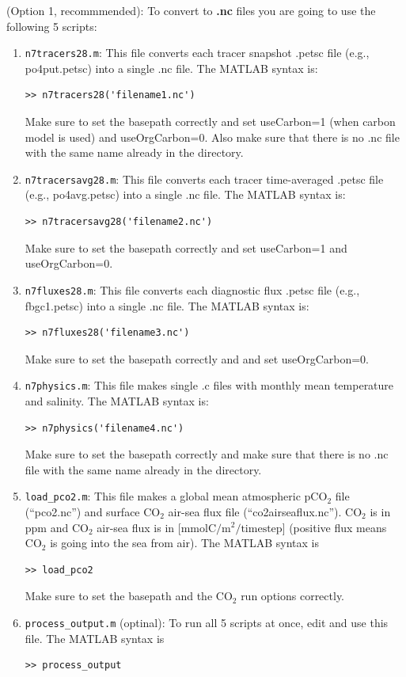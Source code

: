 \documentclass[a4paper]{article}
\def\noin{\noindent }
\begin{document}
\vspace{5mm}
\noin (Option 1, recommmended): To convert to \textbf{.nc} files you are going to use the following 5 scripts:
\begin{enumerate}
\item \verb|n7tracers28.m|: This file converts each tracer snapshot .petsc file (e.g., po4put.petsc) into a single .nc file. The MATLAB syntax is:
\begin{lstlisting}[style=DOS]
 >> n7tracers28('filename1.nc')
\end{lstlisting}
Make sure to set the basepath correctly and set useCarbon=1 (when carbon model is used) and useOrgCarbon=0. Also make sure that there is no .nc file with the same name already in the directory.

\item\verb|n7tracersavg28.m|: This file converts each tracer time-averaged .petsc file (e.g., po4avg.petsc) into a single .nc file. The MATLAB syntax is:
\begin{lstlisting}[style=DOS]
 >> n7tracersavg28('filename2.nc')
\end{lstlisting}
Make sure to set the basepath correctly and set useCarbon=1 and useOrgCarbon=0.

\item\verb|n7fluxes28.m|: This file converts each diagnostic flux .petsc file (e.g., fbgc1.petsc) into a single .nc file. The MATLAB syntax is:
\begin{lstlisting}[style=DOS]
 >> n7fluxes28('filename3.nc')
\end{lstlisting}
Make sure to set the basepath correctly and and set useOrgCarbon=0.

\item\verb|n7physics.m|: This file makes single .c files with monthly mean temperature and salinity. The MATLAB syntax is:
\begin{lstlisting}[style=DOS]
 >> n7physics('filename4.nc')
\end{lstlisting}
Make sure to set the basepath correctly and make sure that there is no .nc file with the same name already in the directory.

\item\verb|load_pco2.m|: This file makes a global mean atmospheric $\mathrm{pCO_{2}}$ file (``pco2.nc'') and surface $\mathrm{CO_{2}}$ air-sea flux file (``co2airseaflux.nc''). $\mathrm{CO_{2}}$ is in ppm and $\mathrm{CO_{2}}$ air-sea flux is in [$\mathrm{mmol C/m^2/timestep}$] (positive flux means $\mathrm{CO_{2}}$ is going into the sea from air). The MATLAB syntax is 
\begin{lstlisting}[style=DOS]
 >> load_pco2
\end{lstlisting}
Make sure to set the basepath and the $\mathrm{CO_{2}}$ run options correctly.

\item\verb|process_output.m| (optinal): To run all 5 scripts at once, edit and use this file. The MATLAB syntax is 
\begin{lstlisting}[style=DOS]
 >> process_output
\end{lstlisting}

\end{enumerate}
\end{document}
